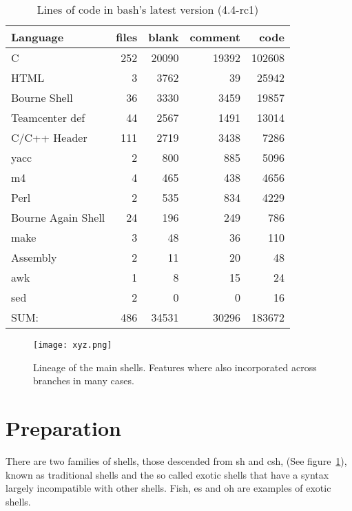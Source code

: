 \begin{table}[p]
\centering
\caption{Lines of code in bash's latest version (4.4-rc1)}
\label{tab:bash-loc}
\begin{tabular}{@{}lrrrr@{}}
\toprule
Language           & files & blank & comment & code   \\ \midrule
C                  & 252   & 20090 & 19392   & 102608 \\
HTML               & 3     & 3762  & 39      & 25942  \\
Bourne Shell       & 36    & 3330  & 3459    & 19857  \\
Teamcenter def     & 44    & 2567  & 1491    & 13014  \\
C/C++ Header       & 111   & 2719  & 3438    & 7286   \\
yacc               & 2     & 800   & 885     & 5096   \\
m4                 & 4     & 465   & 438     & 4656   \\
Perl               & 2     & 535   & 834     & 4229   \\
Bourne Again Shell & 24    & 196   & 249     & 786    \\
make               & 3     & 48    & 36      & 110    \\
Assembly           & 2     & 11    & 20      & 48     \\
awk                & 1     & 8     & 15      & 24     \\
sed                & 2     & 0     & 0       & 16     \\ \midrule
SUM:               & 486   & 34531 & 30296   & 183672 \\ \bottomrule
\end{tabular}
\end{table}

\begin{figure}[p]
    \centering
    \texttt{[image: xyz.png]}
    \caption{Lineage of the main shells\cite{SHELL-HISTORY}. Features where also incorporated across branches in many cases.}
    \label{fig:shell-history}
\end{figure}

\section{Preparation}
There are two families of shells, those descended from sh and csh, (See figure~\ref{fig:shell-history}), known as traditional shells and the so called exotic shells that have a syntax largely incompatible with other shells. Fish\cite{FISH}, es\cite{ES-SHELL} and oh\cite{OH-SHELL} are examples of exotic shells.

